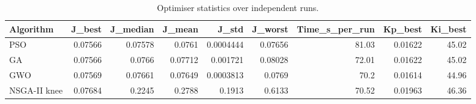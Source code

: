 \begin{table}[t]
\centering\caption{Optimiser statistics over independent runs.}\label{tab:stats}
\begin{tabular}{lrrrrrrrr}
\toprule
Algorithm & J\_best & J\_median & J\_mean & J\_std & J\_worst & Time\_s\_per\_run & Kp\_best & Ki\_best \\
\midrule
PSO & 0.07566 & 0.07578 & 0.0761 & 0.0004444 & 0.07656 & 81.03 & 0.01622 & 45.02 \\
GA & 0.07566 & 0.0766 & 0.07712 & 0.001721 & 0.08028 & 72.01 & 0.01622 & 45.02 \\
GWO & 0.07569 & 0.07661 & 0.07649 & 0.0003813 & 0.0769 & 70.2 & 0.01614 & 44.96 \\
NSGA-II knee & 0.07684 & 0.2245 & 0.2788 & 0.1913 & 0.6133 & 70.52 & 0.01963 & 46.36 \\
\bottomrule
\end{tabular}
\end{table}
